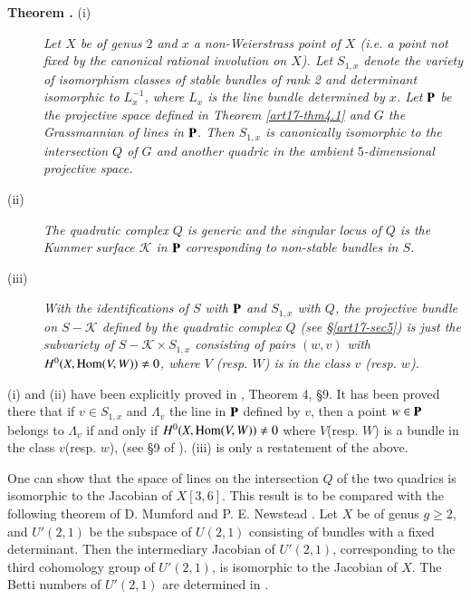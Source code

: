 \begin{description}
\item[{\bf Theorem .\label{art17-thm6.1}} {\rm(i)}] {\em Let $X$ be of genus $2$ and $x$ a non-Weierstrass point of $X$ (i.e. a point not fixed by the canonical rational involution on $X$). Let $S_{1,x}$ denote the variety of isomorphism classes of stable bundles of rank 2 and determinant isomorphic to $L^{-1}_{x}$, where $L_{x}$ is the line bundle determined by $x$. Let $\mathbf{P}$ be the projective space defined in Theorem \ref{art17-thm4.1} and $G$ the Grassmannian of lines in $\mathbf{P}$. Then $S_{1,x}$ is canonically isomorphic to the intersection $Q$ of $G$ and another quadric in the ambient $5$-dimensional projective space.}

\item[\rm(ii)] {\em The quadratic complex $Q$ is generic and the singular locus of $Q$ is the Kummer surface $\mathscr{K}$ in $\mathbf{P}$ corresponding to non-stable bundles in $S$.}

\item[\rm(iii)] {\em With the identifications of $S$ with $\mathbf{P}$ and $S_{1,x}$ with $Q$, the projective bundle on $S-\mathscr{K}$ defined by the quadratic complex $Q$ (see \S\ref{art17-sec5}) is just the subvariety of $S-\mathscr{K}\times S_{1,x}$ consisting of pairs $(w,v)$ with $H^{0}(X,\operatorname{\mathrm{Hom}}(V,W))\neq 0$, where $V$ (resp. $W$) is in the class $v$ (resp. $w$).}
\end{description}

(i) and (ii) have been explicitly proved in \cite{art17-key3}, Theorem 4, \S9. It has been proved there that if $v\in S_{1,x}$ and $\Lambda_{v}$ the line in $\mathbf{P}$ defined by $v$, then a point $w\in \mathbf{P}$ belongs to $\Lambda_{v}$ if and only if $H^{0}(X,\operatorname{\mathrm{Hom}}(V,W))\neq 0$ where $V$(resp. $W$) is a bundle in the class $v$(resp. $w$), (see \S9 of \cite{art17-key3}). (iii) is only a restatement of the above.

\begin{remark*}
One can show that the space of lines on the intersection $Q$ of the two quadrics is isomorphic to the Jacobian of $X[3,6]$. This result is to be compared with the following theorem of D. Mumford and P. E. Newstead \cite{art17-key2}. Let $X$ be of genus $g\geq 2$, and $U'(2,1)$ be the subspace of $U(2,1)$ consisting of bundles with a fixed determinant. Then the intermediary Jacobian of $U'(2,1)$, corresponding to the third cohomology group of $U'(2,1)$, is isomorphic to the Jacobian of $X$. The Betti numbers of $U'(2,1)$ are determined in \cite{art17-key5}.
\end{remark*}

